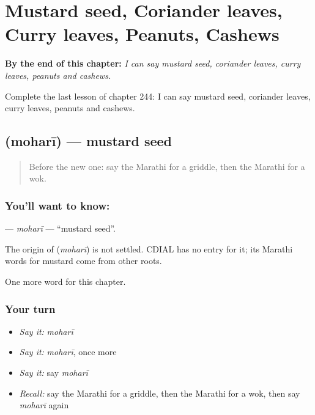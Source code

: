 
\chapter{Mustard seed, Coriander leaves, Curry leaves, Peanuts, Cashews}
\label{ch:mr-mustard-seed-coriander-leaves-curry-leaves-peanuts-cashews}

\begin{chapteropening}
\textbf{By the end of this chapter:} \emph{I can say mustard seed, coriander leaves, curry leaves, peanuts and cashews.}

Complete the last lesson of chapter 244: I can say mustard seed, coriander leaves, curry leaves, peanuts and cashews.
\end{chapteropening}

\section[\texorpdfstring{\mr{मोहरी} (moharī)}{मोहरी (moharī)}]{ (moharī) — mustard seed}

\label{lesson:MR-C244-mohari}



\begin{quote}
Before the new one: say the Marathi for a griddle, then the Marathi for a wok.
\end{quote}

\subsection*{You'll want to know: }
\textbf{} — \emph{moharī} — \textquotedblleft{}mustard seed\textquotedblright{}.

\begin{cousinweb}
The origin of \textbf{} (\emph{moharī}) is not settled. CDIAL has no entry for it; its Marathi words for mustard come from other roots.
\end{cousinweb}

\begin{grammarlens}[title={What you've built}]
One more word for this chapter.
\end{grammarlens}

\subsection*{Your turn}
\begin{itemize}
\raggedright
  \item \emph{Say it:} \emph{moharī}
  \item \emph{Say it:} \emph{moharī}, once more
  \item \emph{Say it:} say \emph{moharī}
  \item \emph{Recall:} say the Marathi for a griddle, then the Marathi for a wok, then say \emph{moharī} again
\end{itemize}

